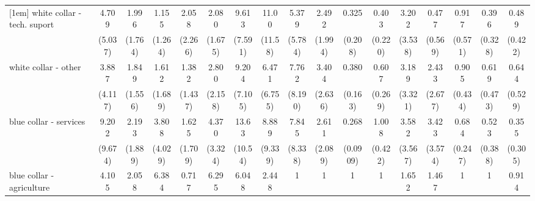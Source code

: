 {\begin{tabular}{l*{16}{c}}
[1em]
white collar - tech. suport&       4.709         &       1.996         &       1.155         &       2.058         &       2.080         &       9.613\sym{**} &       11.00\sym{*}  &       5.379         &       2.492         &       0.325         &       0.403         &       3.202         &       0.477         &       0.917         &       0.396         &       0.489         \\
                    &     (5.037)         &     (1.764)         &     (1.264)         &     (2.266)         &     (1.675)         &     (7.591)         &     (11.58)         &     (5.784)         &     (1.994)         &     (0.208)         &     (0.220)         &     (3.538)         &     (0.569)         &     (0.571)         &     (0.328)         &     (0.422)         \\
[1em]
white collar - other&       3.887         &       1.849         &       1.612         &       1.382         &       2.800         &       9.204\sym{**} &       6.471         &       7.762         &       3.404         &       0.380\sym{*}  &       0.607         &       3.189         &       2.433         &       0.905         &       0.619         &       0.644         \\
                    &     (4.117)         &     (1.556)         &     (1.689)         &     (1.437)         &     (2.158)         &     (7.105)         &     (6.755)         &     (8.190)         &     (2.636)         &     (0.163)         &     (0.269)         &     (3.321)         &     (2.677)         &     (0.434)         &     (0.473)         &     (0.529)         \\
[1em]
blue collar - services&       9.202\sym{*}  &       2.193         &       3.808         &       1.625         &       4.370         &       13.63\sym{***}&       8.889\sym{*}  &       7.845         &       2.611         &       0.268\sym{***}&       1.008         &       3.582         &       3.423         &       0.684         &       0.523         &       0.355         \\
                    &     (9.674)         &     (1.889)         &     (4.029)         &     (1.709)         &     (3.324)         &     (10.54)         &     (9.339)         &     (8.338)         &     (2.089)         &    (0.0909)         &     (0.422)         &     (3.567)         &     (3.574)         &     (0.247)         &     (0.388)         &     (0.305)         \\
[1em]
blue collar - agriculture&       4.105         &       2.058         &       6.384         &       0.717         &       6.295         &       6.048         &       2.448         &           1         &           1         &           1         &           1         &       1.652         &       1.467         &           1         &           1         &       0.914         \\

\end{tabular}}
